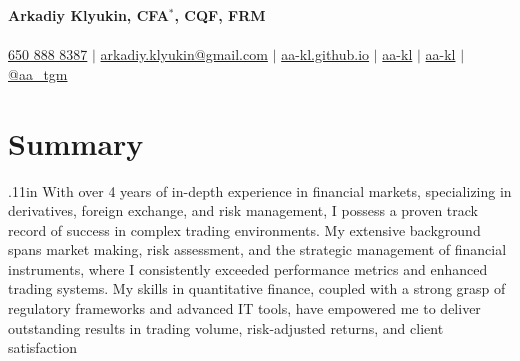 \documentclass[letterpaper,hidelinks]{article}
\begin{document}
\begin{center}
  \textbf{\Huge{Arkadiy Klyukin, CFA$\mathbb{}^\ast$, CQF, FRM}\\} \\ \vspace{1pt}
  \small
  \faMobile* \hspace{.5pt} \href{tel:+16508888387}{650 888 8387}
  $|$
  \faAt \hspace{.5pt} \href{mailto:arkadiy.klyukin@gmail.com}{arkadiy.klyukin@gmail.com}
  $|$
  \faGlobeAmericas \hspace{.5pt} \href{https://aa-kl.github.io}{aa-kl.github.io}
  $|$
  \faGithub \hspace{.5pt} \href{https://github.com/aa-kl}{aa-kl}
  $|$
  \faLinkedinIn \hspace{.5pt} \href{https://www.linkedin.com/in/aa-kl}{aa-kl}
  $|$
  \faTelegramPlane \hspace{.5pt} \href{https://t.me/aa_tgm}{@aa\_tgm}
\end{center}
\vspace{-27pt}
\section{Summary}
{\hspace{0.1in}
\raggedright{\leftskip.11in
With over 4 years of in-depth experience in financial markets, specializing in derivatives, foreign exchange, and risk management, I possess a proven track record of success in complex trading environments. My extensive background spans market making, risk assessment, and the strategic management of financial instruments, where I consistently exceeded performance metrics and enhanced trading systems. My skills in quantitative finance, coupled with a strong grasp of regulatory frameworks and advanced IT tools, have empowered me to deliver outstanding results in trading volume, risk-adjusted returns, and client satisfaction
    \\}
}
\vspace{-8pt}
\end{document}
